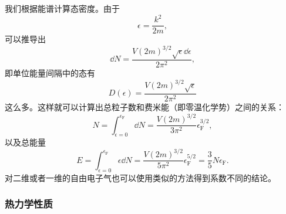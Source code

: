 我们根据能谱计算态密度。由于
\[
    \epsilon = \frac{k^2}{2m},
\]
可以推导出
\[
    \dd{N} = \frac{V (2m)^{3/2} \sqrt{\epsilon} \dd{\epsilon}}{2 \pi^2},
\]
即单位能量间隔中的态有
\begin{equation}
    D(\epsilon) = \frac{V (2m)^{3/2} \sqrt{\epsilon} }{2 \pi^2}
\end{equation}
这么多。这样就可以计算出总粒子数和费米能（即零温化学势）之间的关系：
\begin{equation}
    N = \int_{\epsilon=0}^{\epsilon_{\text{F}}} \dd{N} = \frac{V (2m)^{3/2}}{3 \pi^2} \epsilon_\text{F}^{3/2},
\end{equation}
以及总能量
\begin{equation}
    E = \int_{\epsilon=0}^{\epsilon_{\text{F}}} \epsilon \dd{N} = \frac{V (2m)^{3/2}}{5 \pi^2} \epsilon_\text{F}^{5/2} = \frac{3}{5} N \epsilon_{\text{F}}.
\end{equation}
对二维或者一维的自由电子气也可以使用类似的方法得到系数不同的结论。

\subsubsection{热力学性质} 

